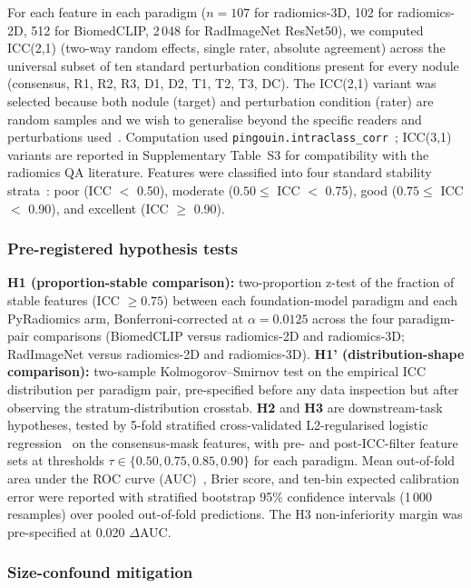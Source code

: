 For each feature in each paradigm ($n = 107$ for radiomics-3D, 102 for radiomics-2D, 512 for BiomedCLIP, 2\,048 for RadImageNet ResNet50), we computed ICC(2,1) (two-way random effects, single rater, absolute agreement) across the universal subset of ten standard perturbation conditions present for every nodule (consensus, R1, R2, R3, D1, D2, T1, T2, T3, DC). The ICC(2,1) variant was selected because both nodule (target) and perturbation condition (rater) are random samples and we wish to generalise beyond the specific readers and perturbations used~\cite{koo2016icc}. Computation used \texttt{pingouin.intraclass\_corr}~\cite{vallat2018pingouin}; ICC(3,1) variants are reported in Supplementary Table~S3 for compatibility with the radiomics QA literature. Features were classified into four standard stability strata~\cite{koo2016icc}: poor (ICC $<$ 0.50), moderate ($0.50 \leq$ ICC $<$ 0.75), good ($0.75 \leq$ ICC $<$ 0.90), and excellent (ICC $\geq$ 0.90).

\subsubsection{Pre-registered hypothesis tests}

\textbf{H1 (proportion-stable comparison):} two-proportion z-test of the fraction of stable features (ICC $\geq 0.75$) between each foundation-model paradigm and each PyRadiomics arm, Bonferroni-corrected at $\alpha = 0.0125$ across the four paradigm-pair comparisons (BiomedCLIP versus radiomics-2D and radiomics-3D; RadImageNet versus radiomics-2D and radiomics-3D). \textbf{H1' (distribution-shape comparison):} two-sample Kolmogorov--Smirnov test on the empirical ICC distribution per paradigm pair, pre-specified before any data inspection but after observing the stratum-distribution crosstab. \textbf{H2} and \textbf{H3} are downstream-task hypotheses, tested by 5-fold stratified cross-validated L2-regularised logistic regression~\cite{hosmer2013} on the consensus-mask features, with pre- and post-ICC-filter feature sets at thresholds $\tau \in \{0.50, 0.75, 0.85, 0.90\}$ for each paradigm. Mean out-of-fold area under the ROC curve (AUC)~\cite{delong1988auc}, Brier score, and ten-bin expected calibration error were reported with stratified bootstrap 95\% confidence intervals (1\,000 resamples) over pooled out-of-fold predictions. The H3 non-inferiority margin was pre-specified at 0.020 $\Delta$AUC.

\subsubsection{Size-confound mitigation}

